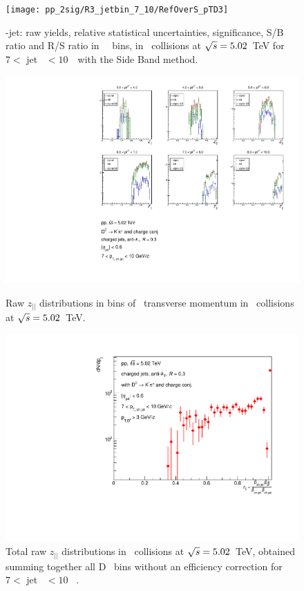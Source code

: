 \begin{figure}[bth]
\begin{minipage}{.4\textwidth}
  \texttt{[image: pp\_2sig/R3\_jetbin\_7\_10/RefOverS\_pTD3]}
\caption{%
\Dzero-jet: raw yields, relative statistical uncertainties, significance, S/B ratio and R/S ratio in \Dzero\ \pt\ bins, in \pp\ collisions at $\sqrt{s}=5.02$~TeV for $7<$ jet \pt\ $<10$~\GeVc\ with the Side Band method.
}
\label{fig:eq_pp_signalParams_7_10_R3}
\end{minipage}
\end{figure}
\begin{figure}[bth]
\centering
\begin{minipage}{.65\textwidth}
  \centering
\includegraphics[width=\textwidth]{pp_2sig/R3_jetbin_7_10/jetRawSpectrum_pTD3}
\caption{Raw $z_{||}$ distributions in bins of \Dzero\ transverse momentum in \pp\ collisions at $\sqrt{s}=5.02$~TeV.}
\label{fig:eq_pp_signBkgJet_Dzero_7_10_R3}
\end{minipage}%
\begin{minipage}{.4\textwidth}
  \centering
\includegraphics[width=\textwidth]{pp_2sig/R3_jetbin_7_10/jetPtSpectrum_SB_pTD3}
\caption{Total raw $z_{||}$ distributions in \pp\ collisions at $\sqrt{s}=5.02$~TeV, obtained summing together all D \pt\ bins without an efficiency correction for $7<$ jet \pt\ $<10$ \GeVc\ .
}
\label{fig:eq_pp_signBkgJet_tot_7_10_R3}
\end{minipage}
\end{figure}

